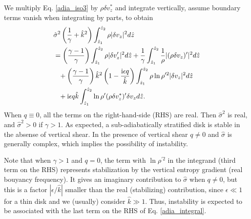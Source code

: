 We multiply Eq. \ref{adia_iso3} by $\rho\delta v_z^*$ and
integrate vertically, assume boundary terms vanish when integrating by
parts, to obtain
\begin{align}
  &\hat{\sigma}^2\left(\frac{1}{\gamma} +
    \hat{k}^2\right)\int_{\hat{z}_1}^{\hat{z}_2}\rho|\delta
  v_z|^2 d\hat{z} \notag\\
  &=  \left(\frac{\gamma-1}{\gamma}\right)
  \int_{\hat{z}_1}^{\hat{z}_2}\rho|\delta v_z^\prime|^2 d\hat{z}
  +\frac{1}{\gamma}\int_{\hat{z}_1}^{\hat{z}_2}\frac{1}{\rho}|(\rho\delta
  v_z)^\prime|^2 d\hat{z}\notag\\
  &\phantom{=} +
  \left(\frac{\gamma-1}{\gamma}\right)\hat{k}^2\left(1-\frac{\mathrm{i}\epsilon
      q}{\hat{k}}\right) \int_{\hat{z}_1}^{\hat{z}_2}\rho\ln\rho^{\prime
    2}|\delta v_z|^2 d\hat{z}\notag\\
  &\phantom{=} + \mathrm{i}\epsilon q \hat{k}
  \int_{\hat{z}_1}^{\hat{z}_2}\ln\rho^\prime(\rho\delta v_z^*)^\prime
  \delta v_z d\hat{z}.\label{adia_integral}
\end{align}
When $q\equiv0$, all the terms on the right-hand-side (RHS) are real. Then
$\hat{\sigma}^2$ is real, and  $\hat{\sigma}^2>0$ if $\gamma>1$. As
expected, a sub-adiabatically stratified disk is stable in the absense
of vertical shear. In the presence of vertical shear $q\neq0$ and
$\hat{\sigma}$ is generally complex, which implies the possibility of
instability.  

Note that when $\gamma>1$ and $q=0$, the term with $\ln\rho^{\prime
  2}$ in the integrand (third term on the RHS) represents
stabilization by the vertical entropy gradient (real bouyancy frequency). 
It gives an imaginary contribution to $\hat{\sigma}$ when $q\neq0$,
but this is a factor $|\epsilon/\hat{k}|$ smaller than the real
(stabilizing) contribution, 
since $\epsilon\ll 1$ for a thin disk and we (usually) consider
$\hat{k}\gg1$. Thus, instability is expected to be associated with the 
last term on the RHS of Eq. \ref{adia_integral}. 

